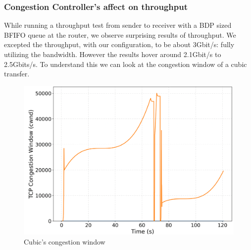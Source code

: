 \documentclass[a4paper,english, 11pt]{report}
\begin{document}

\subsubsection{Congestion Controller's affect on throughput}
While running a throughput test from sender to receiver with a BDP sized BFIFO queue at the router, we observe surprising results of throughput. We excepted the throughput, with our configuration, to be about 3Gbit/s: fully utilizing the bandwidth. However the results hover around 2.1Gbit/s to 2.5Gbits/s. To understand this we can look at the congestion window of a cubic transfer.\\

\begin{figure}[!h!] %
	\centering
	\includegraphics[scale=0.25]{../diagrams/witestlab/cubicwnd.png}
  	\caption{Cubic's congestion window}
  	\label{fig:cubiccwnd}
\end{figure}
\end{document}
